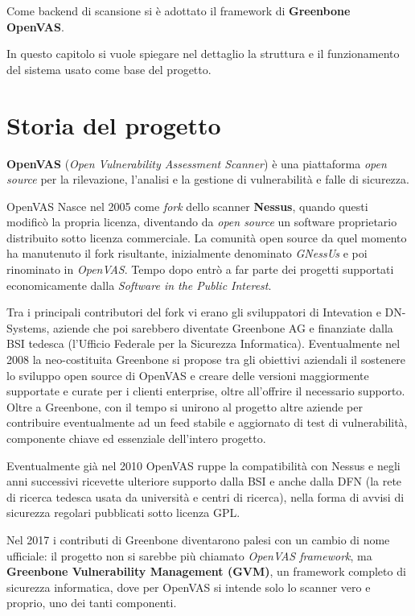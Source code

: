 Come backend di scansione si è adottato il framework di \textbf{Greenbone OpenVAS}.

In questo capitolo si vuole spiegare nel dettaglio la struttura e il funzionamento del sistema usato come base del progetto.

\section{Storia del progetto}
\textbf{OpenVAS} (\emph{Open Vulnerability Assessment Scanner}) è una piattaforma \emph{open source} per la rilevazione, l'analisi e la gestione di vulnerabilità e falle di sicurezza.

OpenVAS Nasce nel 2005 come \emph{fork} dello scanner \textbf{Nessus}, quando questi modificò la propria licenza, diventando da \emph{open source} un software proprietario distribuito sotto licenza commerciale. La comunità open source da quel momento ha manutenuto il fork risultante, inizialmente denominato \emph{GNessUs} e poi rinominato in \emph{OpenVAS}. Tempo dopo entrò a far parte dei progetti supportati economicamente dalla \emph{Software in the Public Interest}.

Tra i principali contributori del fork vi erano gli sviluppatori di Intevation e DN-Systems, aziende che poi sarebbero diventate Greenbone AG e finanziate dalla BSI tedesca (l'Ufficio Federale per la Sicurezza Informatica). Eventualmente nel 2008 la neo-costituita Greenbone si propose tra gli obiettivi aziendali il sostenere lo sviluppo open source di OpenVAS e creare delle versioni maggiormente supportate e curate per i clienti enterprise, oltre all'offrire il necessario supporto. Oltre a Greenbone, con il tempo si unirono al progetto altre aziende per contribuire eventualmente ad un feed stabile e aggiornato di test di vulnerabilità, componente chiave ed essenziale dell'intero progetto.

Eventualmente già nel 2010 OpenVAS ruppe la compatibilità con Nessus e negli anni successivi ricevette ulteriore supporto dalla BSI e anche dalla DFN (la rete di ricerca tedesca usata da università e centri di ricerca), nella forma di avvisi di sicurezza regolari pubblicati sotto licenza GPL.

Nel 2017 i contributi di Greenbone diventarono palesi con un cambio di nome ufficiale: il progetto non si sarebbe più chiamato \emph{OpenVAS framework}, ma \textbf{Greenbone Vulnerability Management (GVM)}, un framework completo di sicurezza informatica, dove per OpenVAS si intende solo lo scanner vero e proprio, uno dei tanti componenti.

